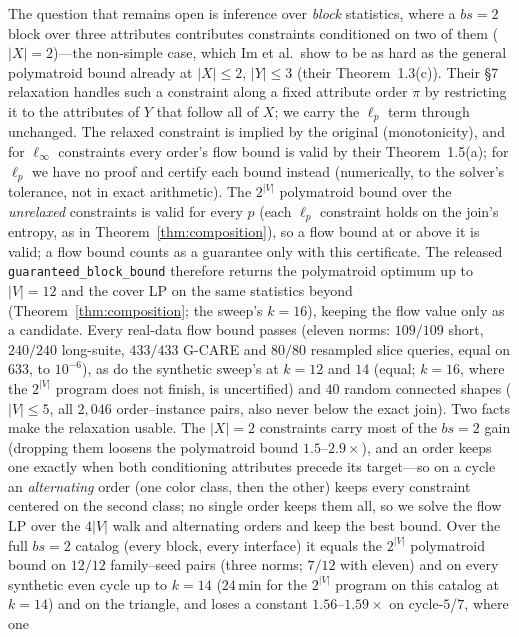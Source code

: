 \documentclass[conference]{IEEEtran}
\begin{document}
The question that remains open is inference over \emph{block}
statistics, where a $bs{=}2$ block over three attributes contributes
constraints conditioned on two of them ($|X|{=}2$)---the non-simple
case, which Im et al.\ show to be as hard as the general polymatroid
bound already at $|X| \le 2$, $|Y| \le 3$ (their Theorem~1.3(c)). Their
\S7 relaxation handles such a constraint along a fixed attribute order
$\pi$ by restricting it to the attributes of $Y$ that follow all of $X$;
we carry the $\ell_p$ term through unchanged. The relaxed constraint is
implied by the original (monotonicity), and for $\ell_\infty$ constraints
every order's flow bound is valid by their Theorem~1.5(a); for $\ell_p$
we have no proof and certify each bound instead (numerically, to the solver's tolerance, not in exact arithmetic). The $2^{|V|}$
polymatroid bound over the \emph{unrelaxed} constraints is valid for
every $p$ (each $\ell_p$ constraint holds on the join's entropy, as in
Theorem~\ref{thm:composition}), so a flow bound at or above it is valid; a flow bound counts as a guarantee only with this certificate. The released \texttt{guaranteed\_block\_bound} therefore returns the polymatroid optimum up to $|V|{=}12$ and the cover LP on the same statistics beyond (Theorem~\ref{thm:composition}; the sweep's $k{=}16$), keeping the flow value only as a candidate.
Every real-data flow bound passes (eleven norms: $109/109$ short,
$240/240$ long-suite, $433/433$ G-CARE and $80/80$ resampled slice
queries, equal on $633$, to $10^{-6}$), as do the synthetic sweep's at
$k{=}12$ and $14$ (equal; $k{=}16$, where the $2^{|V|}$ program does not
finish, is uncertified) and $40$ random connected shapes ($|V| \le 5$, all
$2{,}046$ order--instance pairs, also never below the exact join). Two facts make the
relaxation usable. The
$|X|{=}2$ constraints carry most of the $bs{=}2$ gain (dropping them
loosens the polymatroid bound $1.5$--$2.9\times$), and an order keeps
one exactly when both conditioning attributes precede its target---so on
a cycle an \emph{alternating} order (one color class, then the other)
keeps every constraint centered on the second class; no single order
keeps them all, so we solve the flow LP over the $4|V|$ walk and
alternating orders and keep the best bound. Over the full $bs{=}2$ catalog
(every block, every interface) it equals the $2^{|V|}$ polymatroid bound
on $12/12$ family--seed pairs (three norms; $7/12$ with eleven) and on every synthetic even cycle up to $k{=}14$ ($24$\,min for the $2^{|V|}$ program on this catalog at $k{=}14$) and on
the triangle,
and loses a constant $1.56$--$1.59\times$ on cycle-$5$/$7$, where one
\end{document}
